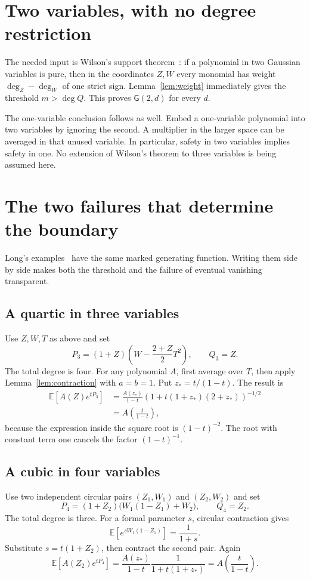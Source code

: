 \documentclass[11pt]{article}
\theoremstyle{definition}\newtheorem{definition}[theorem]{Definition}
\theoremstyle{remark}\newtheorem{remark}[theorem]{Remark}
\newcommand{\E}{\mathbb E}
\newcommand{\G}{\mathsf G}
\begin{document}
\section{Two variables, with no degree restriction}

The needed input is Wilson's support theorem~\cite[Theorem~1]{Wilson}:
if a polynomial in two Gaussian variables is pure, then in the coordinates
$Z,W$ every monomial has weight $\deg_Z-\deg_W$ of one strict sign.
Lemma~\ref{lem:weight} immediately gives the threshold $m>\deg Q$.
This proves $\G(2,d)$ for every $d$.

The one-variable conclusion follows as well. Embed a one-variable
polynomial into two variables by ignoring the second. A multiplier in
the larger space can be averaged in that unused variable. In particular,
safety in two variables implies safety in one. No extension of Wilson's
theorem to three variables is being assumed here.

\section{The two failures that determine the boundary}\label{sec:failures}

Long's examples~\cite{Long} have the same marked generating function.
Writing them side by side makes both the threshold and the failure of
eventual vanishing transparent.

\subsection{A quartic in three variables}
Use $Z,W,T$ as above and set
\[
 P_3=(1+Z)\left(W-\frac{2+Z}{2}T^2\right),\qquad Q_3=Z.
\]
The total degree is four. For any polynomial $A$, first average over
$T$, then apply Lemma~\ref{lem:contraction} with $a=b=1$. Put
$z_*=t/(1-t)$. The result is
\begin{align*}
 \E[A(Z)e^{tP_3}]
 &=\frac{A(z_*)}{1-t}
       \left(1+t(1+z_*)(2+z_*)\right)^{-1/2}\\
 &=A\!\left(\frac{t}{1-t}\right),
\end{align*}
because the expression inside the square root is $(1-t)^{-2}$.
The root with constant term one cancels the factor $(1-t)^{-1}$.

\subsection{A cubic in four variables}
Use two independent circular pairs $(Z_1,W_1)$ and $(Z_2,W_2)$ and set
\[
 P_4=(1+Z_2)\bigl(W_1(1-Z_1)+W_2\bigr),\qquad Q_4=Z_2.
\]
The total degree is three. For a formal parameter $s$, circular
contraction gives
\[
 \E[e^{sW_1(1-Z_1)}]=\frac1{1+s}.
\]
Substitute $s=t(1+Z_2)$, then contract the second pair. Again
\[
 \E[A(Z_2)e^{tP_4}]
  =\frac{A(z_*)}{1-t}\frac{1}{1+t(1+z_*)}
  =A\!\left(\frac{t}{1-t}\right).
\]
\end{document}
